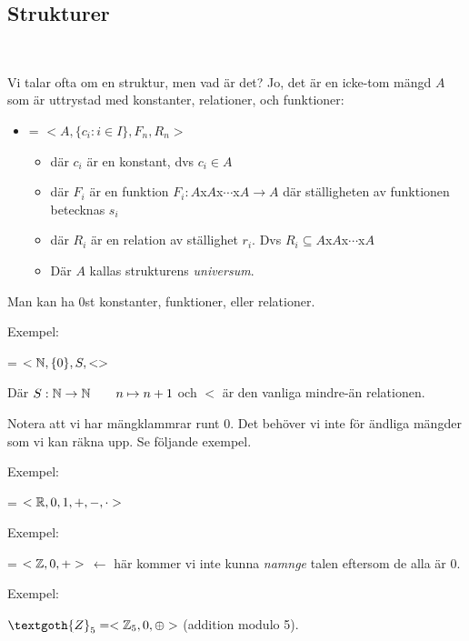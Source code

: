 \subsection{Strukturer}\hfill\\
\par\bigskip
\noindent Vi talar ofta om en struktur, men vad är det? Jo, det är en icke-tom mängd $A$ som är uttrystad med konstanter, relationer, och funktioner:
\par\bigskip
\begin{itemize}
  \item {} = $<A, \{c_i:i\in I\}, F_n, R_n>$
    \begin{itemize}
      \item där $c_i$ är en konstant, dvs $c_i\in A$
      \item där $F_i$ är en funktion $F_i:A$x$A$x$\cdots$x$A\to A$ där ställigheten av funktionen betecknas $s_i$
      \item där $R_i$ är en relation av ställighet $r_i$. Dvs $R_i\subseteq A$x$A$x$\cdots$x$A$
      \item Där $A$ kallas strukturens \textit{universum}.
    \end{itemize}
\end{itemize}
\par\bigskip
\noindent Man kan ha 0st konstanter, funktioner, eller relationer.
\par\bigskip
\noindent Exempel:\par
\noindent{} = $<\mathbb{N}, \{0\}, S, <>$\par
\noindent Där $S:\mathbb{N}\to\mathbb{N}\qquad n\mapsto n+1$ och $<$ är den vanliga mindre-än relationen.\par
Notera att vi har mängklammrar runt 0. Det behöver vi inte för ändliga mängder som vi kan räkna upp. Se följande exempel.
\par\bigskip
\noindent Exempel:\par
\noindent{}  = $<\mathbb{R}, 0, 1, +, -, \cdot>$
\par\bigskip
\noindent Exempel:\par
\noindent {} = $<\mathbb{Z},0,+>$ $\leftarrow$ här kommer vi inte kunna \textit{namnge} talen eftersom de alla är 0.
\par\bigskip
\noindent Exempel:\par
\noindent$\textgoth{Z}_5 = <\Z_5,0, \oplus>$ (addition modulo 5).
\par\bigskip
